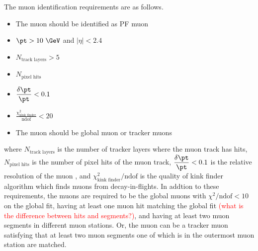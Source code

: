 The muon identification requirements are as follows. 
\begin{itemize}
\item The muon should be identified as PF muon 
\item $\pt>10~\GeV$ and $|\eta|<2.4$ 
\item $N_{\textrm{track layers}}>5$ 
\item $N_{\textrm{pixel hits}}$
\item $\displaystyle \frac{\delta \pt}{\pt} < 0.1$  
\item $\displaystyle \frac{\chi^2_{\textrm{kink finder}}}{\textrm{ndof}} < 20$
\item The muon should be global muon or tracker muons  
\end{itemize}
where $N_{\textrm{track layers}}$ is the number of tracker layers where the muon track has hits, 
$N_{\textrm{pixel hits}}$ is the number of pixel hits of the muon track,
$\displaystyle \frac{\delta \pt}{\pt} < 0.1$ is the relative resolution 
of the muon \pt, 
and $\displaystyle \chi^2_{\textrm{kink finder}}/\textrm{ndof}$ is the quality 
of kink finder algorithm which finds muons from decay-in-flights.  
In addtion to these requirements, the muons are required to be the global muons with 
$\chi^2/\textrm{ndof}<10$ on the global fit, 
having at least one muon hit matching the global fit 
\textcolor{red}{(what is the difference between hits and segments?)},  
and having at least two muon segments in different muon stations. 
Or, the muon can be a tracker muon satisfying that at least two muon 
segments one of which is in the outermost muon station are matched.  

